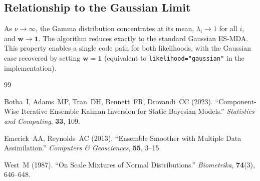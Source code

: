 \documentclass[article,nojss]{jss}
\begin{document}
\subsection{Relationship to the Gaussian Limit}

As $\nu \to \infty$, the Gamma distribution concentrates at its mean,
$\lambda_i \to 1$ for all $i$, and $\mathbf{w} \to \mathbf{1}$.
The algorithm reduces exactly to the standard Gaussian ES-MDA.
This property enables a single code path for both likelihoods, with
the Gaussian case recovered by setting $\mathbf{w} = \mathbf{1}$
(equivalent to \texttt{likelihood="gaussian"} in the implementation).

\begin{thebibliography}{99}

  Botha~I, Adams~MP, Tran~DH, Bennett~FR, Drovandi~CC (2023).
  \newblock ``Component-Wise Iterative Ensemble Kalman Inversion for
             Static Bayesian Models.''
  \newblock \emph{Statistics and Computing}, \textbf{33}, 109.

  Emerick~AA, Reynolds~AC (2013).
  \newblock ``Ensemble Smoother with Multiple Data Assimilation.''
  \newblock \emph{Computers \& Geosciences}, \textbf{55}, 3--15.

  West~M (1987).
  \newblock ``On Scale Mixtures of Normal Distributions.''
  \newblock \emph{Biometrika}, \textbf{74}(3), 646--648.

\end{thebibliography}
\end{document}
